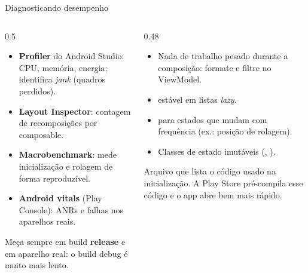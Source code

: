 \documentclass[aspectratio=169,10pt]{beamer}
\begin{document}
\begin{frame}{Diagnosticando desempenho}
  \begin{columns}[T]
    \begin{column}{0.5\textwidth}
      \begin{conceito}[Ferramentas]
        \begin{itemize}
          \item \textbf{Profiler} do Android Studio: CPU, memória, energia; identifica \emph{jank} (quadros perdidos).
          \item \textbf{Layout Inspector}: contagem de recomposições por composable.
          \item \textbf{Macrobenchmark}: mede inicialização e rolagem de forma reproduzível.
          \item \textbf{Android vitals} (Play Console): ANRs e falhas nos aparelhos reais.
        \end{itemize}
      \end{conceito}
      \begin{atencao}
        Meça sempre em build \textbf{release} e em aparelho real: o build debug é muito mais lento.
      \end{atencao}
    \end{column}
    \begin{column}{0.48\textwidth}
      \begin{dica}
        \begin{itemize}
          \item Nada de trabalho pesado durante a composição: formate e filtre no ViewModel.
          \item {} estável em listas \emph{lazy}.
          \item {} para estados que mudam com frequência (ex.: posição de rolagem).
          \item Classes de estado imutáveis (, ).
        \end{itemize}
      \end{dica}
      \begin{conceito}
        Arquivo que lista o código usado na inicialização. A Play Store pré-compila esse código e o app abre bem mais rápido.
      \end{conceito}
    \end{column}
  \end{columns}
\end{frame}

\end{document}
